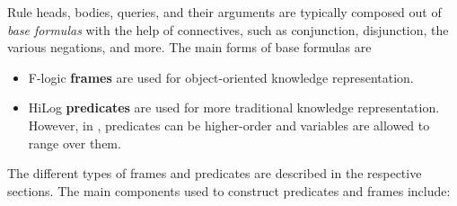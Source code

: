 \documentclass[11pt]{article}
\newcommand{\ERGO}{\mbox{\smaller{\ensuremath{\cal{E}}\smaller{{\sc{RGO}}}}}\xspace}
\newcommand{\FLSYSTEM}{\ERGO}
\begin{document}
Rule heads, bodies, queries, and their arguments are typically composed out
of \emph{base formulas} with the help of connectives, such as
conjunction, disjunction, the various negations, and more. The main forms
of base formulas are
\begin{itemize}
\item  F-logic \textbf{frames} are used for
  object-oriented knowledge representation.
\item  HiLog \textbf{predicates} are used for more traditional knowledge
  representation. However, in \FLSYSTEM, predicates can be higher-order and
  variables are allowed to range over them.
\end{itemize}
The different types of frames and predicates are described in the
respective sections.
The main components used to construct predicates and frames include:
\end{document}
